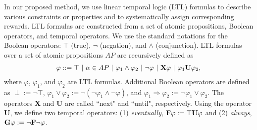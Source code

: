 In our proposed method, we use linear temporal logic (LTL) formulas to describe various constraints or properties and to systematically assign corresponding rewards.
LTL formulas are constructed from a set of atomic propositions, Boolean operators, and temporal operators. We use the standard notations for the Boolean operators: $\top$ (true), $\neg$ (negation), and $\land$ (conjunction).
LTL formulas over a set of atomic propositions $AP$ are recursively defined as
\begin{align*}
  \varphi ::=\top\ |\ \alpha \in AP\ |\ \varphi_1 \land \varphi_2\ |\ \neg \varphi\ |\ \text{{\bf X}} \varphi\ |\ \varphi_1 \text{{\bf U}} \varphi_2,
\end{align*}
where $\varphi$, $\varphi_1$, and $\varphi_2$ are LTL formulas.
Additional Boolean operators are defined as $\perp := \neg \top $, $\varphi_1 \lor \varphi_2 := \neg(\neg \varphi_1 \land \neg \varphi)$, and $\varphi_1 \Rightarrow \varphi_2 := \neg \varphi_1 \lor \varphi_2$.
The operators {\bf X} and {\bf U} are called ``next" and ``until", respectively.
Using the operator {\bf U}, we define two temporal operators: (1) {\it eventually}, $\text{{\bf F}} \varphi := \top \text{{\bf U}} \varphi $ and (2) {\it always}, $\text{{\bf G}} \varphi := \neg \text{{\bf F}} \neg \varphi$.

